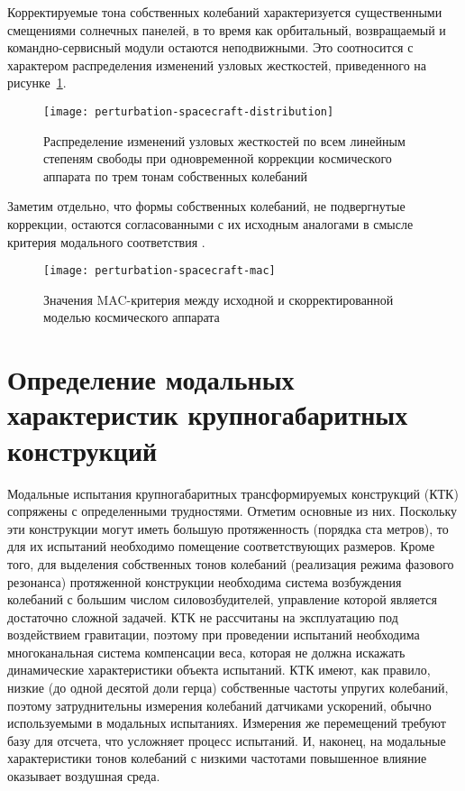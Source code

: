 Корректируемые тона собственных колебаний характеризуется существенными смещениями солнечных панелей, в то время как орбитальный, возвращаемый и командно-сервисный модули остаются неподвижными. Это соотносится с характером распределения изменений узловых жесткостей, приведенного на рисунке~\ref{fig:perturbation-spacecraft-distribution}.

\begin{figure}[H]
	\centering
	\texttt{[image: perturbation-spacecraft-distribution]}
	\caption{Распределение изменений узловых жесткостей по всем линейным степеням свободы при одновременной коррекции космического аппарата по трем тонам собственных колебаний} \label{fig:perturbation-spacecraft-distribution}
\end{figure}

Заметим отдельно, что формы собственных колебаний, не подвергнутые коррекции, остаются согласованными с их исходным аналогами в смысле критерия модального соответствия .

\begin{figure}[H]
	\centering
	\texttt{[image: perturbation-spacecraft-mac]}
	\caption{Значения MAC-критерия между исходной и скорректированной моделью космического аппарата} \label{fig:perturbation-spacecraft-mac}
\end{figure}

\section{Определение модальных характеристик крупногабаритных конструкций}

Модальные испытания крупногабаритных трансформируемых конструкций (КТК) сопряжены с определенными трудностями. Отметим основные из них. Поскольку эти конструкции могут иметь большую протяженность (порядка ста метров), то для их испытаний необходимо помещение соответствующих размеров. Кроме того, для выделения собственных тонов колебаний (реализация режима фазового резонанса) протяженной конструкции необходима система возбуждения колебаний с большим числом силовозбудителей, управление которой является достаточно сложной задачей. КТК не рассчитаны на эксплуатацию под воздействием гравитации, поэтому при проведении испытаний необходима многоканальная система компенсации веса, которая не должна искажать динамические характеристики объекта испытаний. КТК имеют, как правило, низкие (до одной десятой доли герца) собственные частоты упругих колебаний, поэтому затруднительны измерения колебаний датчиками ускорений, обычно используемыми в модальных испытаниях. Измерения же перемещений требуют базу для отсчета, что усложняет процесс испытаний. И, наконец, на модальные характеристики тонов колебаний с низкими частотами повышенное влияние оказывает воздушная среда. 

